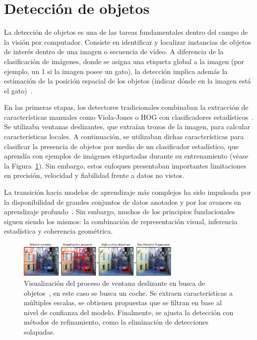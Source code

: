 \section{Detección de objetos}
La detección de objetos es una de las tareas fundamentales dentro del campo de la visión por computador. Consiste en identificar y localizar
instancias de objetos de interés dentro de una imagen o secuencia de vídeo. A diferencia de la clasificación de imágenes, donde se
asigna una etiqueta global a la imagen (por ejemplo, un 1 si la imagen posee un gato), la detección implica además la estimación de la posición
espacial de los objetos (indicar dónde en la imagen está el gato)~\cite{ObjectDetectionSurvey}.
\par
En las primeras etapas, los detectores tradicionales combinaban la extracción de características manuales como Viola-Jones o HOG con
clasificadores estadísticos~\cite{ObjectDetectionSurvey}. Se utilizaba ventanas deslizantes, que extraían trozos de la imagen, para calcular
características locales. A continuación, se utilizaban dichas características para clasificar la presencia de objetos por medio de un
clasificador estadístico, que aprendía con ejemplos de imágenes etiquetadas durante su entrenamiento (véase la Figura~\ref{fig:SelectiveSearch}).
Sin embargo, estos enfoques presentaban importantes limitaciones en precisión, velocidad y fiabilidad frente a datos no vistos.
\par
La transición hacia modelos de aprendizaje más complejos ha sido impulsada por la disponibilidad de grandes conjuntos de datos anotados y
por los avances en aprendizaje profundo~\cite{ObjectDetectionSurvey}. Sin embargo, muchos de los principios fundacionales siguen siendo
los mismos: la combinación de representación visual, inferencia estadística y coherencia geométrica.

\begin{figure}[H]
\begin{center}
    \includegraphics[width=0.7\textwidth]{imagenes/chapter2/selective_search}
\end{center}
\caption{
Visualización del proceso de ventana deslizante en busca de objetos~\cite{VisionBookMIT}, en este caso se busca un coche.
Se extraen características a múltiples escalas, se obtienen propuestas que se filtran en base al nivel de confianza del modelo. Finalmente,
se ajusta la detección con métodos de refinamiento, como la eliminación de detecciones solapadas.
}
\label{fig:SelectiveSearch}
\end{figure}
